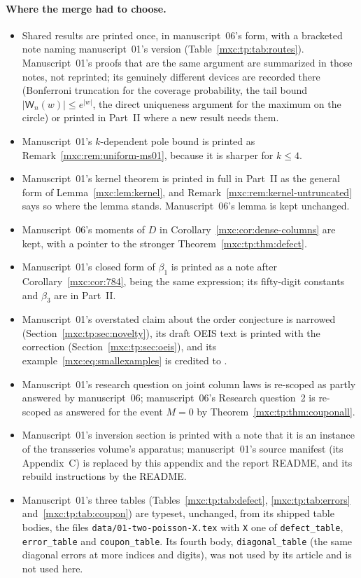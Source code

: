 \documentclass[11pt]{article}
\numberwithin{equation}{section}
\theoremstyle{definition}
\theoremstyle{remark}
\begin{document}
\paragraph{Where the merge had to choose.}
\begin{itemize}
\item Shared results are printed once, in manuscript~06's form, with a
 bracketed note naming manuscript~01's version
 (Table~\ref{mxc:tp:tab:routes}). Manuscript~01's proofs that are the same
 argument are summarized in those notes, not reprinted; its genuinely
 different devices are recorded there (Bonferroni truncation for the
 coverage probability, the tail bound $|\mathsf W_n(w)|\le e^{|w|}$, the
 direct uniqueness argument for the maximum on the circle) or printed in
 Part~II where a new result needs them.
\item Manuscript~01's $k$-dependent pole bound is printed as
 Remark~\ref{mxc:rem:uniform-ms01}, because it is sharper for $k\le4$.
\item Manuscript~01's kernel theorem is printed in full in Part~II as the
 general form of Lemma~\ref{mxc:lem:kernel}, and
 Remark~\ref{mxc:rem:kernel-untruncated} says so where the lemma stands.
 Manuscript~06's lemma is kept unchanged.
\item Manuscript~06's moments of $D$ in Corollary~\ref{mxc:cor:dense-columns}
 are kept, with a pointer to the stronger Theorem~\ref{mxc:tp:thm:defect}.
\item Manuscript~01's closed form of $\beta_1$ is printed as a note after
 Corollary~\ref{mxc:cor:784}, being the same expression; its fifty-digit
 constants and $\beta_3$ are in Part~II.
\item Manuscript~01's overstated claim about the order conjecture is
 narrowed (Section~\ref{mxc:tp:sec:novelty}), its draft OEIS text is
 printed with the correction (Section~\ref{mxc:tp:sec:oeis}), and its
 example~\eqref{mxc:eq:smallexamples} is credited to
 \cite[Remark~26]{mpr2009}.
\item Manuscript~01's research question on joint column laws is
 re-scoped as partly answered by manuscript~06; manuscript~06's Research
 question~2 is re-scoped as answered for the event $M=0$ by
 Theorem~\ref{mxc:tp:thm:couponall}.
\item Manuscript~01's inversion section is printed with a note that it is
 an instance of the transseries volume's apparatus; manuscript~01's source
 manifest (its Appendix~C) is replaced by this appendix and the report
 README, and its rebuild instructions by the README.
\item Manuscript~01's three tables (Tables~\ref{mxc:tp:tab:defect},
 \ref{mxc:tp:tab:errors} and~\ref{mxc:tp:tab:coupon}) are typeset,
 unchanged, from its shipped table bodies, the files
 \texttt{data/01-two-poisson-X.tex} with \texttt{X} one of
 \texttt{defect\_table}, \texttt{error\_table} and
 \texttt{coupon\_table}. Its fourth body, \texttt{diagonal\_table}
 (the same diagonal errors at more indices and digits), was not used by
 its article and is not used here.
\end{itemize}
\end{document}
